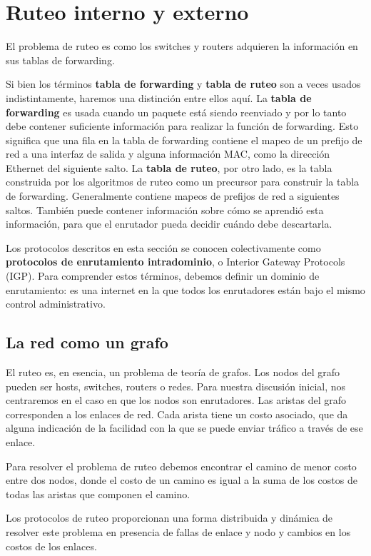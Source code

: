 \section{Ruteo interno y externo}
El problema de ruteo es como los switches y routers adquieren la información en sus tablas de forwarding.

Si bien los términos \textbf{tabla de forwarding} y \textbf{tabla de ruteo} son a veces usados indistintamente, haremos una distinción entre ellos aquí. La \textbf{tabla de forwarding} es usada cuando un paquete está siendo reenviado y por lo tanto debe contener suficiente información para realizar la función de forwarding. Esto significa que una fila en la tabla de forwarding contiene el mapeo de un prefijo de red a una interfaz de salida y alguna información MAC, como la dirección Ethernet del siguiente salto. La \textbf{tabla de ruteo}, por otro lado, es la tabla construida por los algoritmos de ruteo como un precursor para construir la tabla de forwarding. Generalmente contiene mapeos de prefijos de red a siguientes saltos. También puede contener información sobre cómo se aprendió esta información, para que el enrutador pueda decidir cuándo debe descartarla.

Los protocolos descritos en esta sección se conocen colectivamente como \textbf{protocolos de enrutamiento intradominio}, o Interior Gateway Protocols (IGP). Para comprender estos términos, debemos definir un dominio de enrutamiento: es una internet en la que todos los enrutadores están bajo el mismo control administrativo.

\subsection{La red como un grafo}
El ruteo es, en esencia, un problema de teoría de grafos. Los nodos del grafo pueden ser hosts, switches, routers o redes. Para nuestra discusión inicial, nos centraremos en el caso en que los nodos son enrutadores. Las aristas del grafo corresponden a los enlaces de red. Cada arista tiene un costo asociado, que da alguna indicación de la facilidad con la que se puede enviar tráfico a través de ese enlace.

Para resolver el problema de ruteo debemos encontrar el camino de menor costo entre dos nodos, donde el costo de un camino es igual a la suma de los costos de todas las aristas que componen el camino.

Los protocolos de ruteo proporcionan una forma distribuida y dinámica de resolver este problema en presencia de fallas de enlace y nodo y cambios en los costos de los enlaces.

